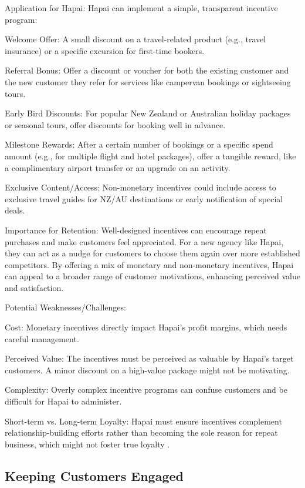 \documentclass{article}
\begin{document}
Application for Hapai:
Hapai can implement a simple, transparent incentive program:

Welcome Offer: A small discount on a travel-related product (e.g., travel insurance) or a specific excursion for first-time bookers.

Referral Bonus: Offer a discount or voucher for both the existing customer and the new customer they refer for services like campervan bookings or sightseeing tours.

Early Bird Discounts: For popular New Zealand or Australian holiday packages or seasonal tours, offer discounts for booking well in advance.

Milestone Rewards: After a certain number of bookings or a specific spend amount (e.g., for multiple flight and hotel packages), offer a tangible reward, like a complimentary airport transfer or an upgrade on an activity.

Exclusive Content/Access: Non-monetary incentives could include access to exclusive travel guides for NZ/AU destinations or early notification of special deals.

Importance for Retention:
Well-designed incentives can encourage repeat purchases and make customers feel appreciated. For a new agency like Hapai, they can act as a nudge for customers to choose them again over more established competitors. By offering a mix of monetary and non-monetary incentives, Hapai can appeal to a broader range of customer motivations, enhancing perceived value and satisfaction.

Potential Weaknesses/Challenges:

Cost: Monetary incentives directly impact Hapai's profit margins, which needs careful management.

Perceived Value: The incentives must be perceived as valuable by Hapai’s target customers. A minor discount on a high-value package might not be motivating.

Complexity: Overly complex incentive programs can confuse customers and be difficult for Hapai to administer.

Short-term vs. Long-term Loyalty: Hapai must ensure incentives complement relationship-building efforts rather than becoming the sole reason for repeat business, which might not foster true loyalty \cite{mabzor_customer_2023}.

\subsection{Keeping Customers Engaged}
\end{document}
